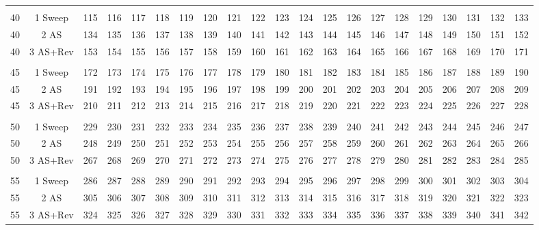 \begin{table}[H]
{\begin{tabular}{ccccccccccccccccccccc}
 &  &  &  &  &  &  &  &  &  &  &  &  &  &  &  &  &  &  &  &  \\
\rowcolor[HTML]{ECF4FF} 
40 & 1 Sweep & 115 & 116 & 117 & 118 & 119 & 120 & 121 & 122 & 123 & 124 & 125 & 126 & 127 & 128 & 129 & 130 & 131 & 132 & 133 \\
\rowcolor[HTML]{FFFFC7} 
40 & 2 AS & 134 & 135 & 136 & 137 & 138 & 139 & 140 & 141 & 142 & 143 & 144 & 145 & 146 & 147 & 148 & 149 & 150 & 151 & 152 \\
\rowcolor[HTML]{FFCCC9} 
40 & 3 AS+Rev & 153 & 154 & 155 & 156 & 157 & 158 & 159 & 160 & 161 & 162 & 163 & 164 & 165 & 166 & 167 & 168 & 169 & 170 & 171 \\
 &  &  &  &  &  &  &  &  &  &  &  &  &  &  &  &  &  &  &  &  \\
\rowcolor[HTML]{ECF4FF} 
45 & 1 Sweep & 172 & 173 & 174 & 175 & 176 & 177 & 178 & 179 & 180 & 181 & 182 & 183 & 184 & 185 & 186 & 187 & 188 & 189 & 190 \\
\rowcolor[HTML]{FFFFC7} 
45 & 2 AS & 191 & 192 & 193 & 194 & 195 & 196 & 197 & 198 & 199 & 200 & 201 & 202 & 203 & 204 & 205 & 206 & 207 & 208 & 209 \\
\rowcolor[HTML]{FFCCC9} 
45 & 3 AS+Rev & 210 & 211 & 212 & 213 & 214 & 215 & 216 & 217 & 218 & 219 & 220 & 221 & 222 & 223 & 224 & 225 & 226 & 227 & 228 \\
 &  &  &  &  &  &  &  &  &  &  &  &  &  &  &  &  &  &  &  &  \\
\rowcolor[HTML]{ECF4FF} 
50 & 1 Sweep & 229 & 230 & 231 & 232 & 233 & 234 & 235 & 236 & 237 & 238 & 239 & 240 & 241 & 242 & 243 & 244 & 245 & 246 & 247 \\
\rowcolor[HTML]{FFFFC7} 
50 & 2 AS & 248 & 249 & 250 & 251 & 252 & 253 & 254 & 255 & 256 & 257 & 258 & 259 & 260 & 261 & 262 & 263 & 264 & 265 & 266 \\
\rowcolor[HTML]{FFCCC9} 
50 & 3 AS+Rev & 267 & 268 & 269 & 270 & 271 & 272 & 273 & 274 & 275 & 276 & 277 & 278 & 279 & 280 & 281 & 282 & 283 & 284 & 285 \\
 &  &  &  &  &  &  &  &  &  &  &  &  &  &  &  &  &  &  &  &  \\
\rowcolor[HTML]{ECF4FF} 
55 & 1 Sweep & 286 & 287 & 288 & 289 & 290 & 291 & 292 & 293 & 294 & 295 & 296 & 297 & 298 & 299 & 300 & 301 & 302 & 303 & 304 \\
\rowcolor[HTML]{FFFFC7} 
55 & 2 AS & 305 & 306 & 307 & 308 & 309 & 310 & 311 & 312 & 313 & 314 & 315 & 316 & 317 & 318 & 319 & 320 & 321 & 322 & 323 \\
\rowcolor[HTML]{FFCCC9} 
55 & 3 AS+Rev & 324 & 325 & 326 & 327 & 328 & 329 & 330 & 331 & 332 & 333 & 334 & 335 & 336 & 337 & 338 & 339 & 340 & 341 & 342 \\

\end{tabular}}
\end{table}

